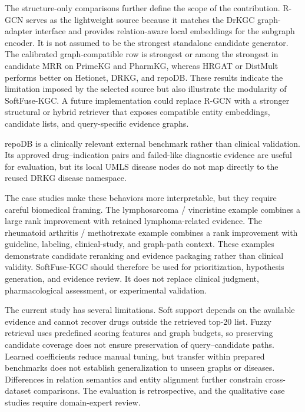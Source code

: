 \documentclass[pdflatex,sn-mathphys-num]{sn-jnl}
\newcommand{\softfuse}{SoftFuse-KGC}
\newcommand{\drkgc}{DrKGC}
\begin{document}
The structure-only comparisons further define the scope of the contribution. R-GCN serves as the lightweight source because it matches the \drkgc{} graph-adapter interface and provides relation-aware local embeddings for the subgraph encoder. It is not assumed to be the strongest standalone candidate generator. The calibrated graph-compatible row is strongest or among the strongest in candidate MRR on PrimeKG and PharmKG, whereas HRGAT or DistMult performs better on Hetionet, DRKG, and repoDB. These results indicate the limitation imposed by the selected source but also illustrate the modularity of \softfuse{}. A future implementation could replace R-GCN with a stronger structural or hybrid retriever that exposes compatible entity embeddings, candidate lists, and query-specific evidence graphs.


repoDB is a clinically relevant external benchmark rather than clinical validation. Its approved drug--indication pairs and failed-like diagnostic evidence are useful for evaluation, but its local UMLS disease nodes do not map directly to the reused DRKG disease namespace. 



The case studies make these behaviors more interpretable, but they require careful biomedical framing. The lymphosarcoma / vincristine example combines a large rank improvement with retained lymphoma-related evidence. The rheumatoid arthritis / methotrexate example combines a rank improvement with guideline, labeling, clinical-study, and graph-path context. These examples demonstrate candidate reranking and evidence packaging rather than clinical validity. \softfuse{} should therefore be used for prioritization, hypothesis generation, and evidence review. It does not replace clinical judgment, pharmacological assessment, or experimental validation.


\begin{revisionblock}
The current study has several limitations. Soft support depends on the available evidence and cannot recover drugs outside the retrieved top-20 list. Fuzzy retrieval uses predefined scoring features and graph budgets, so preserving candidate coverage does not ensure preservation of query--candidate paths. Learned coefficients reduce manual tuning, but transfer within prepared benchmarks does not establish generalization to unseen graphs or diseases. Differences in relation semantics and entity alignment further constrain cross-dataset comparisons. The evaluation is retrospective, and the qualitative case studies require domain-expert review.
\end{revisionblock}
\end{document}
